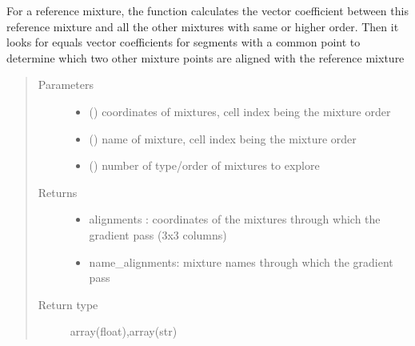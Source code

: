 \documentclass[letterpaper,10pt,english]{sphinxmanual}
\begin{document}
\label{\detokenize{ExperimentsPlannification:module-modules}}

\begin{fulllineitems}
\label{\detokenize{ExperimentsPlannification:modules.compute_alignments}}
\sphinxAtStartPar
For a reference mixture, the function calculates the vector coefficient between this reference mixture and all the other mixtures with same or higher order. Then it looks for  equals vector coefficients for segments with a common point to determine which two other mixture points are aligned with the reference mixture
\begin{quote}\begin{description}
\item[{Parameters}] \leavevmode\begin{itemize}
\item {} 
\sphinxAtStartPar
{} () \textendash{} coordinates of mixtures, cell index being the mixture order 

\item {} 
\sphinxAtStartPar
{} () \textendash{} name of mixture, cell index being the mixture order

\item {} 
\sphinxAtStartPar
{} () \textendash{} number of type/order of mixtures to explore

\end{itemize}

\item[{Returns}] \leavevmode
\sphinxAtStartPar
\begin{itemize}
\item {} 
\sphinxAtStartPar
alignments : coordinates of the mixtures through which the gradient pass (3x3 columns)

\item {} 
\sphinxAtStartPar
name\_alignments: mixture names through which the gradient pass

\end{itemize}


\item[{Return type}] \leavevmode
\sphinxAtStartPar
array(float),array(str)

\end{description}\end{quote}

\end{fulllineitems}
\end{document}
